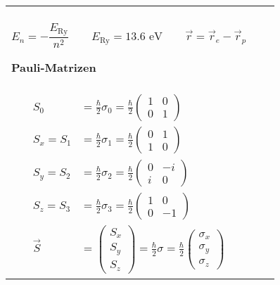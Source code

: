 \documentclass[landscape,8pt]{scrartcl}
\newcommand{\myheading}[1]{\noindent\textbf{#1}\\}
\begin{document}
\begin{tabular}{lll}
\begin{minipage}{0.3\linewidth}
\myheading{$H_2$-Atom}
\[E_n = -\frac{E_\text{Ry}}{n^2}	\qquad E_\text{Ry} = 13.6\text{ eV} \qquad \vec r = \vec r_e - \vec r_p\]

\myheading{Pauli-Matrizen}
{\begin{align*}
S_0 &= \frac{\hbar}{2}\sigma_0 = \frac{\hbar}{2} \begin{pmatrix}1&0\\0&1\end{pmatrix}	\\
S_x = S_1 &= \frac{\hbar}{2}\sigma_1 = \frac{\hbar}{2} \begin{pmatrix}0&1\\1&0\end{pmatrix}	\\
S_y = S_2 &= \frac{\hbar}{2}\sigma_2 = \frac{\hbar}{2} \begin{pmatrix}0&-i\\i&0\end{pmatrix}	\\
S_z = S_3 &= \frac{\hbar}{2}\sigma_3 = \frac{\hbar}{2} \begin{pmatrix}1&0\\0&-1\end{pmatrix}	\\
\vec S &= \begin{pmatrix}S_x\\S_y\\S_z\end{pmatrix} = \frac\hbar 2 \sigma = \frac \hbar 2 \begin{pmatrix}
\sigma_x \\ \sigma_y \\ \sigma_z
\end{pmatrix}
\end{align*}}


\end{minipage}
\end{tabular}
\end{document}
